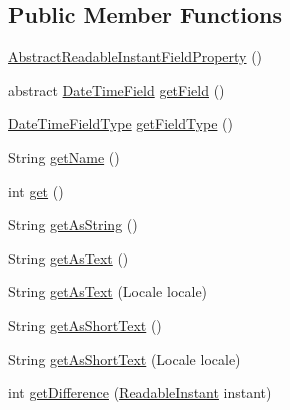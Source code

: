 \subsection*{Public Member Functions}
\begin{DoxyCompactItemize}
\item 
\hyperlink{classorg_1_1joda_1_1time_1_1field_1_1_abstract_readable_instant_field_property_af78173918e133907d1264214ee261f39}{Abstract\-Readable\-Instant\-Field\-Property} ()
\item 
abstract \hyperlink{classorg_1_1joda_1_1time_1_1_date_time_field}{Date\-Time\-Field} \hyperlink{classorg_1_1joda_1_1time_1_1field_1_1_abstract_readable_instant_field_property_a82f184a3f8f2f06231f9524e876e5acb}{get\-Field} ()
\item 
\hyperlink{classorg_1_1joda_1_1time_1_1_date_time_field_type}{Date\-Time\-Field\-Type} \hyperlink{classorg_1_1joda_1_1time_1_1field_1_1_abstract_readable_instant_field_property_a548e6ccc800a9d7355b592edd0b7ae59}{get\-Field\-Type} ()
\item 
String \hyperlink{classorg_1_1joda_1_1time_1_1field_1_1_abstract_readable_instant_field_property_ac5683d8a6fd1b53bb730652e85137132}{get\-Name} ()
\item 
int \hyperlink{classorg_1_1joda_1_1time_1_1field_1_1_abstract_readable_instant_field_property_aa95a23fa1608cd6d33d5a1ae48b493f0}{get} ()
\item 
String \hyperlink{classorg_1_1joda_1_1time_1_1field_1_1_abstract_readable_instant_field_property_aceb549fdbcf12ee6c6a88a6c433b604e}{get\-As\-String} ()
\item 
String \hyperlink{classorg_1_1joda_1_1time_1_1field_1_1_abstract_readable_instant_field_property_abddad37827470cae49cf3c976b6d3d84}{get\-As\-Text} ()
\item 
String \hyperlink{classorg_1_1joda_1_1time_1_1field_1_1_abstract_readable_instant_field_property_a530f572b1cf03884cea700f1e6743488}{get\-As\-Text} (Locale locale)
\item 
String \hyperlink{classorg_1_1joda_1_1time_1_1field_1_1_abstract_readable_instant_field_property_ae0af178f23429ee7bcba9dd70ad0d6fc}{get\-As\-Short\-Text} ()
\item 
String \hyperlink{classorg_1_1joda_1_1time_1_1field_1_1_abstract_readable_instant_field_property_add2385958d6a89f2228b616bdf28207c}{get\-As\-Short\-Text} (Locale locale)
\item 
int \hyperlink{classorg_1_1joda_1_1time_1_1field_1_1_abstract_readable_instant_field_property_a12836c365c47c2ef54c7482aad5ce043}{get\-Difference} (\hyperlink{interfaceorg_1_1joda_1_1time_1_1_readable_instant}{Readable\-Instant} instant)

\end{DoxyCompactItemize}
